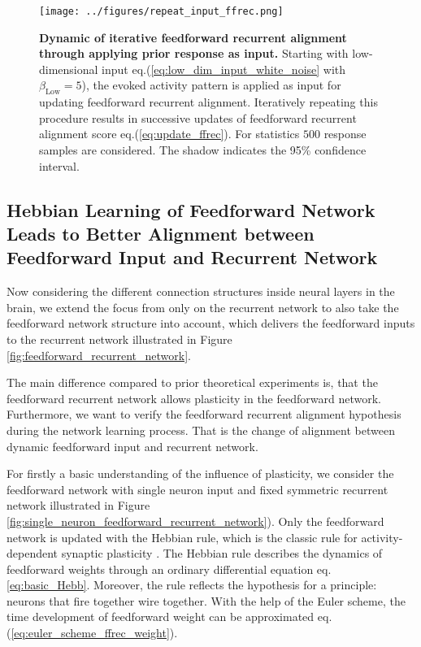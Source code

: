 \documentclass[11pt]{article}
\begin{document}
	\begin{figure}
		\centering
		\caption{\textbf{Dynamic of iterative feedforward recurrent alignment through applying prior response as input.} Starting with low-dimensional input eq.(\ref{eq:low_dim_input_white_noise} with $\beta_{\text{Low}} = 5$), the evoked activity pattern is applied as input for updating feedforward recurrent alignment. Iteratively repeating this procedure results in successive updates of feedforward recurrent alignment score eq.(\ref{eq:update_ffrec}). For statistics $500$ response samples are considered. The shadow indicates the 95\% confidence interval.}
		\texttt{[image: ../figures/repeat\_input\_ffrec.png]}
		\label{fig:ffrec_repeat_input}
	\end{figure}
	\null
	\vfill
	
	\clearpage
	\subsection{Hebbian Learning of Feedforward Network Leads to Better Alignment between Feedforward Input and Recurrent Network}
	
	Now considering the different connection structures inside neural layers in the brain, we extend the focus from only on the recurrent network to also take the feedforward network structure into account, which delivers the feedforward inputs to the  recurrent network illustrated in Figure \ref{fig:feedforward_recurrent_network}. 
	
	The main difference compared to prior theoretical experiments is, that the feedforward recurrent network allows plasticity in the feedforward network. Furthermore, we want to verify the feedforward recurrent alignment hypothesis during the network learning process. That is the change of alignment between dynamic feedforward input and recurrent network. 
	
	For firstly a basic understanding of the influence of plasticity, we consider the feedforward network with single neuron input and fixed symmetric recurrent network illustrated in Figure \ref{fig:single_neuron_feedforward_recurrent_network}). Only the feedforward network is updated with the Hebbian rule, which is the classic rule for activity-dependent synaptic plasticity \cite{dayan2005theoretical}. The Hebbian rule describes the dynamics of feedforward weights through an ordinary differential equation eq. \ref{eq:basic_Hebb}. Moreover, the rule reflects the hypothesis for a principle: neurons that fire together wire together. With the help of the Euler scheme, the time development of feedforward weight can be approximated eq.(\ref{eq:euler_scheme_ffrec_weight}). 
	
\end{document}
